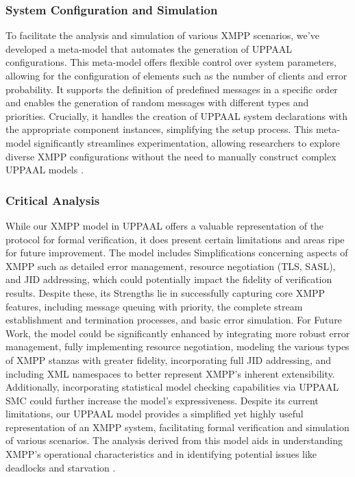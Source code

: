 \subsubsection{System Configuration and Simulation}
To facilitate the analysis and simulation of various XMPP scenarios, we've developed a meta-model that automates the generation of UPPAAL configurations. This meta-model offers flexible control over system parameters, allowing for the configuration of elements such as the number of clients and error probability. It supports the definition of predefined messages in a specific order and enables the generation of random messages with different types and priorities. Crucially, it handles the creation of UPPAAL system declarations with the appropriate component instances, simplifying the setup process. This meta-model significantly streamlines experimentation, allowing researchers to explore diverse XMPP configurations without the need to manually construct complex UPPAAL models \cite{behrmann2004tutorial,larsen1997uppaal}.

\subsubsection{Critical Analysis}
While our XMPP model in UPPAAL offers a valuable representation of the protocol for formal verification, it does present certain limitations and areas ripe for future improvement. The model includes Simplifications concerning aspects of XMPP such as detailed error management, resource negotiation (TLS, SASL), and JID addressing, which could potentially impact the fidelity of verification results. Despite these, its Strengths lie in successfully capturing core XMPP features, including message queuing with priority, the complete stream establishment and termination processes, and basic error simulation. For Future Work, the model could be significantly enhanced by integrating more robust error management, fully implementing resource negotiation, modeling the various types of XMPP stanzas with greater fidelity, incorporating full JID addressing, and including XML namespaces to better represent XMPP's inherent extensibility. Additionally, incorporating statistical model checking capabilities via UPPAAL SMC could further increase the model's expressiveness. Despite its current limitations, our UPPAAL model provides a simplified yet highly useful representation of an XMPP system, facilitating formal verification and simulation of various scenarios. The analysis derived from this model aids in understanding XMPP's operational characteristics and in identifying potential issues like deadlocks and starvation \cite{clarke1997model,bengtsson2003timed}.

